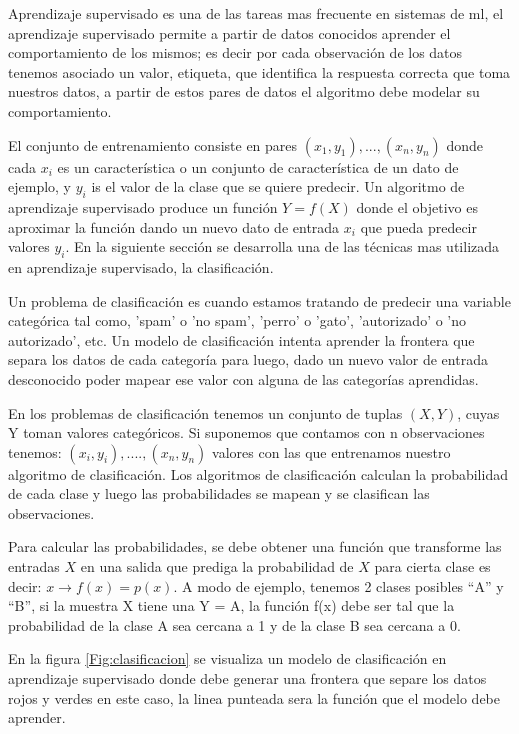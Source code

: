 Aprendizaje supervisado es una de las tareas mas frecuente en sistemas de \ac{ml}, el aprendizaje supervisado permite a partir de datos conocidos aprender el comportamiento de los mismos; es decir por cada observación de los datos tenemos asociado un valor, etiqueta, que identifica la respuesta correcta que toma nuestros datos, a partir de estos pares de datos el algoritmo debe modelar su comportamiento. 

El conjunto de entrenamiento consiste en pares $(x_1, y_1), ...,(x_n, y_n)$ donde cada $x_i$  es un característica o un conjunto de característica de un dato de ejemplo, y $y_i$ is el valor de la clase que se quiere predecir. Un algoritmo de aprendizaje supervisado produce un función $Y = f(X)$ donde el objetivo es aproximar la función dando un nuevo dato de entrada $x_i$ que pueda predecir valores $y_i$. En la siguiente sección se desarrolla una de las técnicas mas utilizada en aprendizaje supervisado, la clasificación.

Un problema de clasificación es cuando estamos tratando de predecir una variable categórica tal como, 'spam' o 'no spam', 'perro' o 'gato', 'autorizado' o 'no autorizado', etc. Un modelo de clasificación intenta aprender la frontera que separa los datos de cada categoría para luego, dado un nuevo valor de entrada desconocido poder mapear ese valor con alguna de las categorías aprendidas.

En los problemas de clasificación tenemos un conjunto de tuplas $(X,Y)$, cuyas Y toman valores categóricos. Si suponemos que contamos con n observaciones tenemos: $(x_i,y_i),....,(x_n,y_n)$ valores con las que entrenamos nuestro algoritmo de clasificación. Los algoritmos de clasificación  calculan la probabilidad de cada clase y luego las probabilidades se mapean y se clasifican las observaciones.

Para calcular las probabilidades, se debe obtener una función que transforme las entradas $X$ en una salida que prediga la probabilidad de $X$ para cierta clase es decir: $ x \longrightarrow f(x) = p(x) $. A modo de ejemplo,  tenemos 2 clases posibles “A” y “B”, si la muestra X tiene una Y = A, la función f(x) debe ser tal que la probabilidad de la clase A sea cercana a 1 y  de la clase B sea cercana a 0.

En la figura \ref{Fig:clasificacion} se visualiza un modelo de clasificación en aprendizaje supervisado donde debe generar una frontera que separe los datos rojos y verdes en este caso, la linea punteada sera la función que el modelo debe aprender. 

